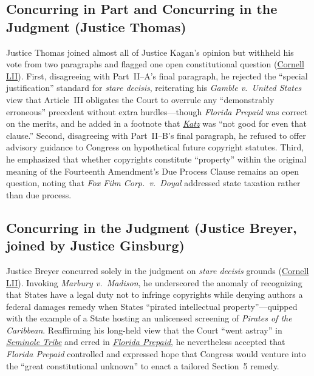 \documentclass[12pt]{article}
\begin{document}
\subsection{Concurring in Part and Concurring in the Judgment (Justice Thomas)}
Justice Thomas joined almost all of Justice Kagan's opinion but withheld his vote from two paragraphs and flagged one open constitutional question (\href{https://www.law.cornell.edu/supremecourt/text/18-877}{Cornell LII}). First, disagreeing with Part~II--A's final paragraph, he rejected the ``special justification'' standard for \textit{stare decisis}, reiterating his \textit{Gamble v.\ United States} view that Article~III obligates the Court to overrule any ``demonstrably erroneous'' precedent without extra hurdles---though \textit{Florida Prepaid} was correct on the merits, and he added in a footnote that \href{https://supreme.justia.com/cases/federal/us/546/356/}{\textit{Katz}} was ``not good for even that clause.'' Second, disagreeing with Part~II--B's final paragraph, he refused to offer advisory guidance to Congress on hypothetical future copyright statutes. Third, he emphasized that whether copyrights constitute ``property'' within the original meaning of the Fourteenth Amendment's Due Process Clause remains an open question, noting that \textit{Fox Film Corp.\ v.\ Doyal} addressed state taxation rather than due process.

\subsection{Concurring in the Judgment (Justice Breyer, joined by Justice Ginsburg)}
Justice Breyer concurred solely in the judgment on \textit{stare decisis} grounds (\href{https://www.law.cornell.edu/supremecourt/text/18-877}{Cornell LII}). Invoking \textit{Marbury v.\ Madison}, he underscored the anomaly of recognizing that States have a legal duty not to infringe copyrights while denying authors a federal damages remedy when States ``pirated intellectual property''---quipped with the example of a State hosting an unlicensed screening of \textit{Pirates of the Caribbean}. Reaffirming his long-held view that the Court ``went astray'' in \href{https://supreme.justia.com/cases/federal/us/517/44/}{\textit{Seminole Tribe}} and erred in \href{https://supreme.justia.com/cases/federal/us/527/627/}{\textit{Florida Prepaid}}, he nevertheless accepted that \textit{Florida Prepaid} controlled and expressed hope that Congress would venture into the ``great constitutional unknown'' to enact a tailored Section~5 remedy.
\end{document}
